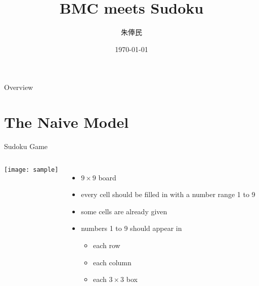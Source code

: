 \documentclass[11pt]{beamer}
\theoremstyle{definition}
\begin{document}
\title{BMC meets Sudoku}
\author[朱俸民]{朱俸民}
\date{\today}


\begin{frame}
    \titlepage
\end{frame}

\begin{frame}{Overview}
    \tableofcontents
\end{frame}

\section{The Naive Model}

\begin{frame}{Sudoku Game}
    \begin{columns}
        \begin{center}
            \texttt{[image: sample]}
        \end{center}
        \begin{itemize}
            \item $9 \times 9$ board
            \item every cell should be filled in with a number range 1 to 9
            \item some cells are already given
            \item numbers 1 to 9 should appear in
            \begin{itemize}
                \item each row
                \item each column
                \item each $3 \times 3$ box
            \end{itemize}
        \end{itemize}
    \end{columns}
\end{frame}
\end{document}
